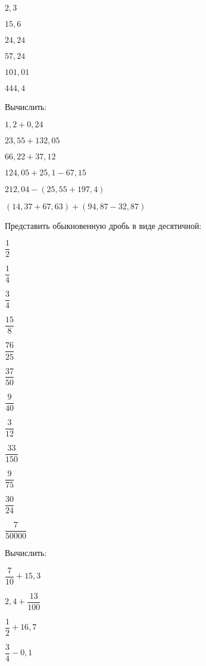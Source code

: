 \begin{class}[type=class, number=1]
\begin{listofex}
		\begin{enumcols}[itemcolumns=6]
			\item \( 2,3 \)
			\item \( 15,6 \)
			\item \( 24,24 \)
			\item \( 57,24 \)
			\item \( 101,01 \)
			\item \( 444,4 \)
		\end{enumcols}
		\item Вычислить:
		\begin{enumcols}[itemcolumns=2]
			\item \( 1,2+0,24 \)
			\item \( 23,55+132,05 \)
			\item \( 66,22+37,12 \)
			\item \( 124,05+25,1-67,15 \)
			\item \( 212,04-(25,55+197,4) \)
			\item \( (14,37+67,63)+(94,87-32,87) \)
		\end{enumcols}
		\item Представить обыкновенную дробь в виде десятичной:
		\begin{enumcols}[itemcolumns=6]
			\item \( \dfrac{1}{2} \)
			\item \( \dfrac{1}{4} \)
			\item \( \dfrac{3}{4} \)
			\item \( \dfrac{15}{8} \)
			\item \( \dfrac{76}{25} \)
			\item \( \dfrac{37}{50} \)
			\item \( \dfrac{9}{40} \)
			\item \( \dfrac{3}{12} \)
			\item \( \dfrac{33}{150} \)
			\item \( \dfrac{9}{75} \)
			\item \( \dfrac{30}{24} \)
			\item \( \dfrac{7}{50000} \)
		\end{enumcols}
		\item Вычислить:
		\begin{enumcols}[itemcolumns=6]
			\item \( \dfrac{7}{10}+15,3 \)
			\item \( 2,4+\dfrac{13}{100} \)
			\item \( \dfrac{1}{2}+16,7 \)
			\item \( \dfrac{3}{4}-0,1 \)

\end{enumcols}
\end{listofex}
\end{class}
